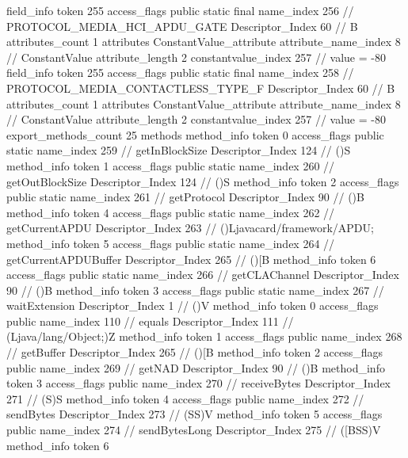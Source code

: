 {{{{			field_info {
				token	255
				access_flags	public static final
				name_index	256		// PROTOCOL_MEDIA_HCI_APDU_GATE
				Descriptor_Index	60		// B
				attributes_count	1
				attributes {
				ConstantValue_attribute {
					attribute_name_index	8		// ConstantValue
					attribute_length	2
					constantvalue_index	257		// value = -80
				}
				}
			}
			field_info {
				token	255
				access_flags	public static final
				name_index	258		// PROTOCOL_MEDIA_CONTACTLESS_TYPE_F
				Descriptor_Index	60		// B
				attributes_count	1
				attributes {
				ConstantValue_attribute {
					attribute_name_index	8		// ConstantValue
					attribute_length	2
					constantvalue_index	257		// value = -80
				}
				}
			}
			}
			export_methods_count	25
			methods {
				method_info {
					token	0
					access_flags	public static
					name_index	259		// getInBlockSize
					Descriptor_Index	124		// ()S
				}
				method_info {
					token	1
					access_flags	public static
					name_index	260		// getOutBlockSize
					Descriptor_Index	124		// ()S
				}
				method_info {
					token	2
					access_flags	public static
					name_index	261		// getProtocol
					Descriptor_Index	90		// ()B
				}
				method_info {
					token	4
					access_flags	public static
					name_index	262		// getCurrentAPDU
					Descriptor_Index	263		// ()Ljavacard/framework/APDU;
				}
				method_info {
					token	5
					access_flags	public static
					name_index	264		// getCurrentAPDUBuffer
					Descriptor_Index	265		// ()[B
				}
				method_info {
					token	6
					access_flags	public static
					name_index	266		// getCLAChannel
					Descriptor_Index	90		// ()B
				}
				method_info {
					token	3
					access_flags	public static
					name_index	267		// waitExtension
					Descriptor_Index	1		// ()V
				}
				method_info {
					token	0
					access_flags	public
					name_index	110		// equals
					Descriptor_Index	111		// (Ljava/lang/Object;)Z
				}
				method_info {
					token	1
					access_flags	public
					name_index	268		// getBuffer
					Descriptor_Index	265		// ()[B
				}
				method_info {
					token	2
					access_flags	public
					name_index	269		// getNAD
					Descriptor_Index	90		// ()B
				}
				method_info {
					token	3
					access_flags	public
					name_index	270		// receiveBytes
					Descriptor_Index	271		// (S)S
				}
				method_info {
					token	4
					access_flags	public
					name_index	272		// sendBytes
					Descriptor_Index	273		// (SS)V
				}
				method_info {
					token	5
					access_flags	public
					name_index	274		// sendBytesLong
					Descriptor_Index	275		// ([BSS)V
				}
				method_info {
					token	6
}}}}}
